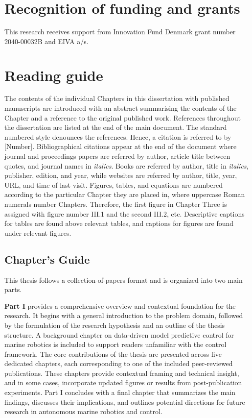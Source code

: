 \section*{Recognition of funding and grants}
This research receives support from Innovation Fund Denmark grant number 2040-00032B and EIVA a/s.

\section*{Reading guide}
The contents of the individual Chapters in this dissertation with published manuscripts are introduced with an abstract summarising the contents of the Chapter and a reference to the original published work. References throughout the dissertation are listed at the end of the main document. The standard numbered style denounces the references. Hence, a citation is referred to by [Number]. Bibliographical citations appear at the end of the document where journal and proceedings papers are referred by author, article title between quotes, and journal names in \textit{italics}. Books are referred by author, title in \textit{italics}, publisher, edition, and year, while websites are referred by author, title, year, URL, and time of last visit. Figures, tables, and equations are numbered according to the particular Chapter they are placed in, where uppercase Roman numerals number Chapters. Therefore, the first figure in Chapter Three is assigned with figure number III.1 and the second III.2, etc. Descriptive captions for tables are found above relevant tables, and captions for figures are found under relevant figures. 

\subsection*{Chapter's Guide}
This thesis follows a collection-of-papers format and is organized into two main parts. 

\textbf{Part I} provides a comprehensive overview and contextual foundation for the research. It begins with a general introduction to the problem domain, followed by the formulation of the research hypothesis and an outline of the thesis structure. A background chapter on data-driven model predictive control for marine robotics is included to support readers unfamiliar with the control framework. The core contributions of the thesis are presented across five dedicated chapters, each corresponding to one of the included peer-reviewed publications. These chapters provide contextual framing and technical insight, and in some cases, incorporate updated figures or results from post-publication experiments. Part I concludes with a final chapter that summarizes the main findings, discusses their implications, and outlines potential directions for future research in autonomous marine robotics and control.


